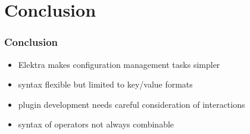 \section{Conclusion}

\begin{frame}
	\frametitle{Conclusion}
	\begin{itemize}
	\item Elektra makes configuration management tasks simpler
	\item syntax flexible but limited to key/value formats
	\item plugin development needs careful consideration of interactions
	\item syntax of operators not always combinable
	\end{itemize}
\end{frame}



\nocite{raab2017introducing}

\appendix

\begin{frame}[allowframebreaks]
	
	
\end{frame}




